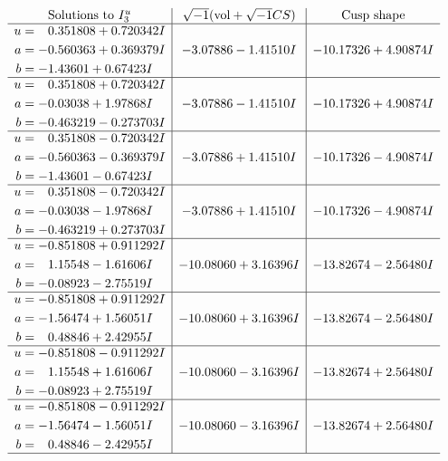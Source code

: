 \documentclass[1p]{elsarticle_modified}
\theoremstyle{definition}
\newcommand{\I}{\sqrt{-1}}
\begin{document}
$$\begin{array}{c|c|c}  
\text{Solutions to }I^u_{3}& \I (\text{vol} + \sqrt{-1}CS) & \text{Cusp shape}\\
 \hline 
\begin{aligned}
u &= \phantom{-}0.351808 + 0.720342 I \\
a &= -0.560363 + 0.369379 I \\
b &= -1.43601 + 0.67423 I\end{aligned}
 & -3.07886 - 1.41510 I & -10.17326 + 4.90874 I \\ \hline\begin{aligned}
u &= \phantom{-}0.351808 + 0.720342 I \\
a &= -0.03038 + 1.97868 I \\
b &= -0.463219 - 0.273703 I\end{aligned}
 & -3.07886 - 1.41510 I & -10.17326 + 4.90874 I \\ \hline\begin{aligned}
u &= \phantom{-}0.351808 - 0.720342 I \\
a &= -0.560363 - 0.369379 I \\
b &= -1.43601 - 0.67423 I\end{aligned}
 & -3.07886 + 1.41510 I & -10.17326 - 4.90874 I \\ \hline\begin{aligned}
u &= \phantom{-}0.351808 - 0.720342 I \\
a &= -0.03038 - 1.97868 I \\
b &= -0.463219 + 0.273703 I\end{aligned}
 & -3.07886 + 1.41510 I & -10.17326 - 4.90874 I \\ \hline\begin{aligned}
u &= -0.851808 + 0.911292 I \\
a &= \phantom{-}1.15548 - 1.61606 I \\
b &= -0.08923 - 2.75519 I\end{aligned}
 & -10.08060 + 3.16396 I & -13.82674 - 2.56480 I \\ \hline\begin{aligned}
u &= -0.851808 + 0.911292 I \\
a &= -1.56474 + 1.56051 I \\
b &= \phantom{-}0.48846 + 2.42955 I\end{aligned}
 & -10.08060 + 3.16396 I & -13.82674 - 2.56480 I \\ \hline\begin{aligned}
u &= -0.851808 - 0.911292 I \\
a &= \phantom{-}1.15548 + 1.61606 I \\
b &= -0.08923 + 2.75519 I\end{aligned}
 & -10.08060 - 3.16396 I & -13.82674 + 2.56480 I \\ \hline\begin{aligned}
u &= -0.851808 - 0.911292 I \\
a &= -1.56474 - 1.56051 I \\
b &= \phantom{-}0.48846 - 2.42955 I\end{aligned}
 & -10.08060 - 3.16396 I & -13.82674 + 2.56480 I\\
 \hline 
 \end{array}$$\newpage\newpage\renewcommand{\arraystretch}{1}
\end{document}

